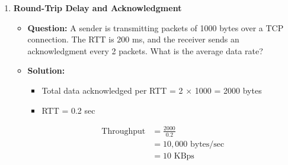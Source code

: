 \begin{enumerate}
   \item \textbf{Round-Trip Delay and Acknowledgment}
   \begin{itemize}
       \item \textbf{Question:} A sender is transmitting packets of 1000 bytes over a TCP connection. The RTT is 200 ms, and the receiver sends an acknowledgment every 2 packets. What is the average data rate?
       \item \textbf{Solution:}
       \begin{itemize}
           \item Total data acknowledged per RTT = 2 × 1000 = 2000 bytes
           \item RTT = 0.2 sec
       \end{itemize}
       \begin{align*}
           \text{Throughput} &= \frac{2000}{0.2} \\
           &= 10,000 \text{ bytes/sec} \\
           &= 10 \text{ KBps}
       \end{align*}
   \end{itemize}
\end{enumerate}